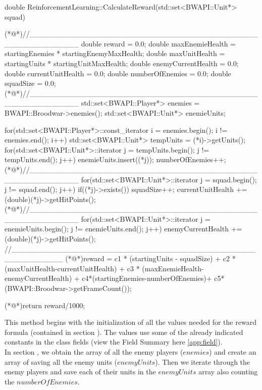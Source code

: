 \begin{Sourcecode}[caption=CalculateReward Method]
double ReinforcementLearning::CalculateReward(std::set<BWAPI::Unit*> squad)
{
(*@\lnote@*)//_________________________________________________________	
	double reward = 0.0;
	double maxEnemieHealth = startingEnemies * startingEnemyMaxHealth;
	double maxUnitHealth = startingUnits * startingUnitMaxHealth;
	double enemyCurrentHealth = 0.0;
	double currentUnitHealth = 0.0;
	double numberOfEnemies = 0.0;
	double squadSize = 0.0;
(*@\lnote@*)//_________________________________________________________
	std::set<BWAPI::Player*> enemies = BWAPI::Broodwar->enemies();	
	std::set<BWAPI::Unit*> enemieUnits;

	for(std::set<BWAPI::Player*>::const_iterator i = enemies.begin(); i != enemies.end(); i++)
	{
		std::set<BWAPI::Unit*> tempUnits = (*i)->getUnits();
		for(std::set<BWAPI::Unit*>::iterator j = tempUnits.begin(); j != tempUnits.end(); j++)
		{
			enemieUnits.insert((*j));
			numberOfEnemies++;
		}
	}
(*@\lnote@*)//_________________________________________________________
	for(std::set<BWAPI::Unit*>::iterator j = squad.begin(); j != squad.end(); j++)
	{
		if((*j)->exists()) squadSize++;
		currentUnitHealth += (double)(*j)->getHitPoints();
	}
(*@\lnote@*)//_________________________________________________________
	for(std::set<BWAPI::Unit*>::iterator j = enemieUnits.begin(); j != enemieUnits.end(); j++)
	{
		enemyCurrentHealth += (double)(*j)->getHitPoints();
	}	
//_________________________________________________________
	(*@\lnote@*)reward = c1 * (startingUnits - squadSize) + c2 * (maxUnitHealth-currentUnitHealth) + c3 * (maxEnemieHealth-enemyCurrentHealth) + c4*(startingEnemies-numberOfEnemies)+ c5*(BWAPI::Broodwar->getFrameCount());
	
	(*@\lnote@*)return reward/1000;
}
\end{Sourcecode}
This method begins with the initialization of all the values needed for the reward formula (contained in section ). The values use some of the already indicated constants in the class fields (view the Field Summary here \ref{app:field}). \\

In section , we obtain the array of all the enemy players ($enemies$) and create an array of saving all the enemy units ($enemyUnits$). Then we iterate through the enemy players and save each of their units in the $enemyUnits$ array also counting the $numberOfEnemies$. \\

